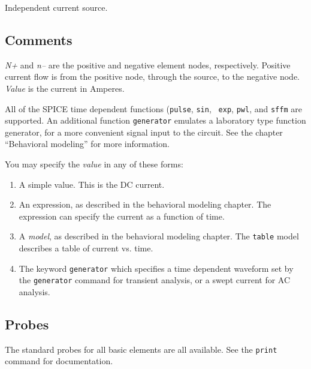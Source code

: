 Independent current source.
\subsection{Comments}

{\it N+} and {\it n--} are the positive and negative element nodes,
respectively.  Positive current flow is from the positive node, through the
source, to the negative node.  {\it Value} is the current in Amperes.

All of the SPICE time dependent functions ({\tt pulse}, {\tt sin}, {\tt
exp}, {\tt pwl}, and {\tt sffm} are supported.  An additional
function {\tt generator} emulates a laboratory type function generator, for
a more convenient signal input to the circuit.
See the chapter ``Behavioral modeling'' for more information.

You may specify the {\it value} in any of these forms:

\begin{enumerate}
  
\item
A simple value.  This is the DC current.
  
\item
An expression, as described in the behavioral modeling chapter.  The
expression can specify the current as a function of time.

\item
A {\it model}, as described in the behavioral modeling chapter.  The
{\tt table} model describes a table of current vs. time.

\item
The keyword {\tt generator} which specifies a time dependent waveform
set by the {\tt generator} command for transient analysis, or a swept
current for AC analysis.

\end{enumerate}
\subsection{Probes}

The standard probes for all basic elements are all available.  See the
{\tt print} command for documentation.
